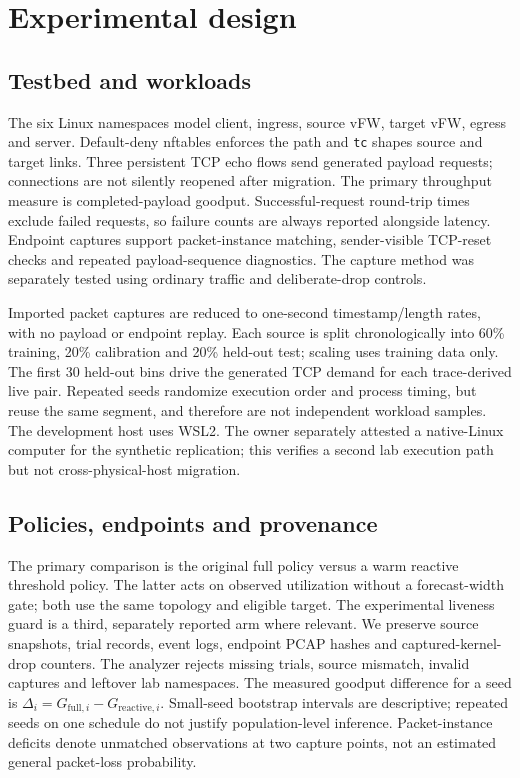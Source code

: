 \documentclass[11pt]{article}
\begin{document}
\section{Experimental design}
\subsection{Testbed and workloads}
The six Linux namespaces model client, ingress, source vFW, target vFW, egress and server. Default-deny nftables enforces the path and \texttt{tc} shapes source and target links. Three persistent TCP echo flows send generated payload requests; connections are not silently reopened after migration. The primary throughput measure is completed-payload goodput. Successful-request round-trip times exclude failed requests, so failure counts are always reported alongside latency. Endpoint captures support packet-instance matching, sender-visible TCP-reset checks and repeated payload-sequence diagnostics. The capture method was separately tested using ordinary traffic and deliberate-drop controls.

Imported packet captures are reduced to one-second timestamp/length rates, with no payload or endpoint replay. Each source is split chronologically into 60\% training, 20\% calibration and 20\% held-out test; scaling uses training data only. The first 30 held-out bins drive the generated TCP demand for each trace-derived live pair. Repeated seeds randomize execution order and process timing, but reuse the same segment, and therefore are not independent workload samples. The development host uses WSL2. The owner separately attested a native-Linux computer for the synthetic replication; this verifies a second lab execution path but not cross-physical-host migration.

\subsection{Policies, endpoints and provenance}
The primary comparison is the original full policy versus a warm reactive threshold policy. The latter acts on observed utilization without a forecast-width gate; both use the same topology and eligible target. The experimental liveness guard is a third, separately reported arm where relevant. We preserve source snapshots, trial records, event logs, endpoint PCAP hashes and captured-kernel-drop counters. The analyzer rejects missing trials, source mismatch, invalid captures and leftover lab namespaces. The measured goodput difference for a seed is $\Delta_i=G_{\mathrm{full},i}-G_{\mathrm{reactive},i}$. Small-seed bootstrap intervals are descriptive; repeated seeds on one schedule do not justify population-level inference. Packet-instance deficits denote unmatched observations at two capture points, not an estimated general packet-loss probability.
\end{document}
